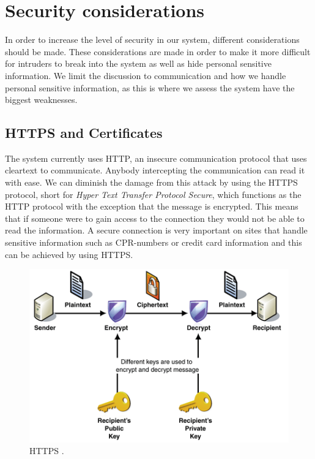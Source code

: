 \section{Security considerations}
In order to increase the level of security in our system, different considerations should be made. These considerations are made in order to make it more difficult for intruders to break into the system as well as hide personal sensitive information. We limit the discussion to communication and how we handle personal sensitive information, as this is where we assess the system have the biggest weaknesses.
 
\subsection*{HTTPS and Certificates} 
The system currently uses HTTP, an insecure communication protocol that uses cleartext to communicate. Anybody intercepting the communication can read it with ease. We can diminish the damage from this attack by using the HTTPS protocol, short for \textit{Hyper Text Transfer Protocol Secure}, which functions as the HTTP protocol with the exception that the message is encrypted. This means that if someone were to gain access to the connection they would not be able to read the information. A secure connection is very important on sites that handle sensitive information such as CPR-numbers or credit card information and this can be achieved by using HTTPS\cite{HTTPS}.

\begin{figure}[ht]
	\begin{center}
		\includegraphics[scale=0.9]{graphics/HTTPS.png}
		\caption{HTTPS \cite{https_pic}.}
		\label{fig:HTTPS}
	\end{center} 
\end{figure}


